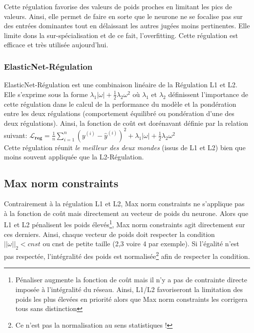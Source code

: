 \noindent Cette régulation favorise des valeurs de poids proches en limitant les pics de valeurs. Ainsi, elle permet de faire en sorte que le neurone ne se focalise pas sur des entrées dominantes tout en délaissant les autres jugées moins pertinentes. Elle limite dons la sur-spécialisation et de ce fait, l'overfitting. Cette régulation est efficace et très utilisée aujourd'hui.

\subsubsection{ElasticNet-Régulation}

ElasticNet-Régulation est une combinaison linéaire de la Régulation L1 et L2. Elle s'exprime sous la forme $\lambda_1|\omega|+\frac{1}{2}\lambda_2\omega^2$ où $\lambda_1$ et $\lambda_2$ définissent l'importance de cette régulation dans le calcul de la performance du modèle et la pondération entre les deux régulations (comportement équilibré ou pondération d'une des deux régulations). Ainsi, la fonction de coût est dorénavant définie par la relation suivant:  $\boldsymbol{\mathcal{L}_{reg}}=\frac{1}{n}\sum_{i=1}^{n}(y^{(i)}-\hat{y}^{(i)})^{2}+\lambda_1|\omega|+\frac{1}{2}\lambda_2\omega^2$\\

\noindent Cette régulation réunit \textit{le meilleur des deux mondes} (issus de L1 et L2) bien que moins souvent appliquée que la L2-Régulation.

\subsection{Max norm constraints}

Contrairement à la régulation L1 et L2, Max norm constraints ne s'applique pas à la fonction de coût mais directement au vecteur de poids du neurone. Alors que L1 et L2 pénalisent les poids élevés\footnote{Pénaliser augmente la fonction de coût mais il n'y a pas de contrainte directe imposée à l'intégralité du réseau. Ainsi, L1/L2 favoriseront la limitation des poids les plus élevées en priorité alors que Max norm constraints les corrigera tous sans distinction}, Max norm constraints agit directement sur ces derniers. Ainsi, chaque vecteur de poids doit respecter la condition $||\omega||_2 < cnst$ ou cnst de petite taille (2,3 voire 4 par exemple). Si l'égalité n'est pas respectée, l'intégralité des poids est normalisée\footnote{Ce n'est pas la normalisation au sens statistiques !} afin de respecter la condition.\\

